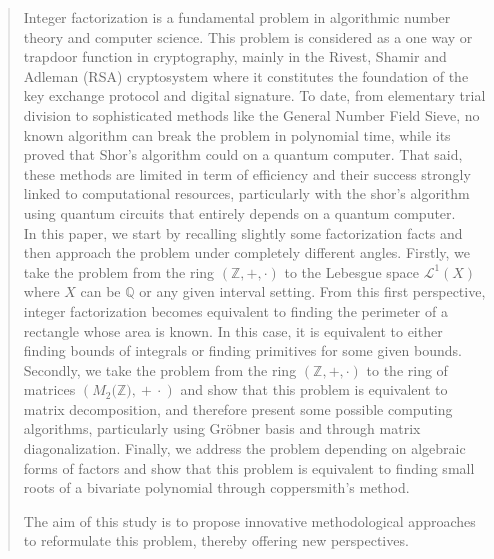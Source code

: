 \documentclass[sigconf,balance=false]{acmart}
\begin{document}
\renewcommand{\shortauthors}{Gilda. R. Bansimba. Regis. F. Babindamana}%
\begin{abstract}
  Integer factorization is a fundamental problem in algorithmic number theory and computer science. 
This problem is considered as a one way or trapdoor function in cryptography, mainly in the Rivest, Shamir and Adleman (RSA) cryptosystem where it constitutes the foundation of the key exchange protocol and digital signature.
To date, from elementary trial division to sophisticated methods like the General Number Field Sieve, no known algorithm can break the problem in polynomial time, while its proved that Shor's algorithm could on a quantum computer. That said, these methods are limited in term of efficiency and their success strongly linked to computational resources, particularly with the shor's algorithm using quantum circuits that entirely depends on a quantum computer.\\
In this paper, we start by recalling slightly some factorization facts and then approach the problem under completely different angles. Firstly, we take the problem from the ring $\displaystyle\left(\mathbb{Z}, \text{+}, \cdot\right)$ to the Lebesgue space $\mathcal{L}^{1}\left(X\right)$ where $X$ can be $\mathbb{Q}$ or any given interval setting. From this first perspective, integer factorization becomes equivalent to finding the perimeter of a rectangle whose area is known. In this case, it is equivalent to either finding bounds of integrals or finding primitives for some given bounds. 
Secondly, we take the problem from the ring $\displaystyle\left(\mathbb{Z}, \text{+}, \cdot\right) $ to the ring of matrices $\left( M_{2}\text{(}\mathbb{Z}\text{)}, \ \text{+} \ \cdot\right)$ and show that this problem is equivalent to matrix decomposition, and therefore present some possible computing algorithms, particularly using Gröbner basis and through matrix diagonalization.
Finally, we address the problem depending on algebraic forms of factors and show that this problem is equivalent to finding small roots of a bivariate polynomial through coppersmith's method.

The aim of this study is to propose innovative methodological approaches to reformulate this problem, thereby offering new perspectives. 

\end{abstract}
\end{document}
